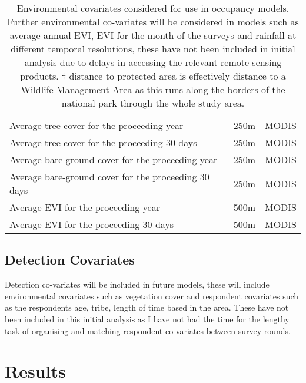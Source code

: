 \begin{table}[h]
\begin{center}
\begin{tabular}{l p{3cm} p{7cm}}
			Average tree cover for the proceeding year
			                                            & 250m						& MODIS\\			
			Average tree cover for the proceeding 30 days
			                                            & 250m						& MODIS\\			
			Average bare-ground cover for the proceeding year
			                                            & 250m						& MODIS\\			
			Average bare-ground cover for the proceeding 30 days
			                                            & 250m						& MODIS\\			         			
			Average EVI for the proceeding year         & 500m						& MODIS\\			
			Average EVI for the proceeding 30 days      & 500m						& MODIS\\			
			\hline \hline						
		\end{tabular}
		\caption{Environmental covariates considered for use in occupancy models. Further environmental co-variates will be considered in models such as average annual EVI, EVI for the month of the surveys and rainfall at different temporal resolutions, these have not been included in initial analysis due to delays in accessing the relevant remote sensing products. $\dagger$ distance to protected area is effectively distance to a Wildlife Management Area as this runs along the borders of the national park through the whole study area.}
	\label{table:env_covariates}
	\end{center}
\end{table}

\subsection{Detection Covariates}

Detection co-variates will be included in future models, these will include environmental covariates such as vegetation cover and respondent covariates such as the respondents age, tribe, length of time based in the area. These have not been included in this initial analysis as I have not had the time for the lengthy task of organising and matching respondent co-variates between survey rounds.

\section{Results}

